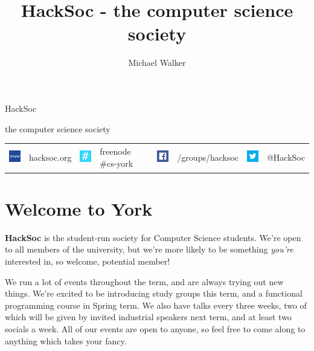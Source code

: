 \documentclass[10pt,a4paper,oneside]{article}
\author{Michael Walker}
\title{HackSoc - the computer science society}
\begin{document}

\begin{adjustbox}{minipage=0.9\linewidth,center}
  {\fontsize{2.75cm}{1em}  HackSoc}

  \vspace{0.35cm}

  \hfill {\fontsize{0.9cm}{1em}  the computer science society}
\end{adjustbox}


\vspace{0.3cm}

\begin{tabular}{llllllll}
\multicolumn{1}{m{1cm}}{\includegraphics[width=1cm, height=1cm]{www-512.png}} &
hacksoc.org &
\multicolumn{1}{m{1cm}}{\includegraphics[width=1cm, height=1cm]{irc-512.png}} &
freenode \#cs-york &
\multicolumn{1}{m{1cm}}{\includegraphics[width=1cm, height=1cm]{facebook-512.png}} &
/groups/hacksoc &
\multicolumn{1}{m{1cm}}{\includegraphics[width=1cm, height=1cm]{twitter-512.png}} &
@HackSoc
\end{tabular}


\vspace{0.2cm}

\section*{Welcome to York}

\textbf{HackSoc} is the student-run society for Computer Science
students. We're open to all members of the university, but we're more
likely to be something \textit{you're} interested in, so welcome,
potential member!

We run a lot of events throughout the term, and are always trying out
new things. We're excited to be introducing study groups this term,
and a functional programming course in Spring term. We also have talks
every three weeks, two of which will be given by invited industrial
speakers next term, and at least two socials a week. All of our events
are open to anyone, so feel free to come along to anything which takes
your fancy.
\end{document}
